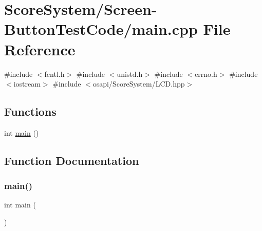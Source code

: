 \hypertarget{_screen-_button_test_code_2main_8cpp}{}\section{Score\+System/\+Screen-\/\+Button\+Test\+Code/main.cpp File Reference}
\label{_screen-_button_test_code_2main_8cpp}
{\ttfamily \#include $<$fcntl.\+h$>$}\newline
{\ttfamily \#include $<$unistd.\+h$>$}\newline
{\ttfamily \#include $<$errno.\+h$>$}\newline
{\ttfamily \#include $<$iostream$>$}\newline
{\ttfamily \#include $<$osapi/\+Score\+System/\+L\+C\+D.\+hpp$>$}\newline
\subsection*{Functions}
\begin{DoxyCompactItemize}
\item 
int \hyperlink{_screen-_button_test_code_2main_8cpp_ae66f6b31b5ad750f1fe042a706a4e3d4}{main} ()
\end{DoxyCompactItemize}


\subsection{Function Documentation}
\mbox{\label{_screen-_button_test_code_2main_8cpp_ae66f6b31b5ad750f1fe042a706a4e3d4}} 
\subsubsection{\texorpdfstring{main()}{main()}}
{\footnotesize\ttfamily int main (\begin{DoxyParamCaption}{ }\end{DoxyParamCaption})}


